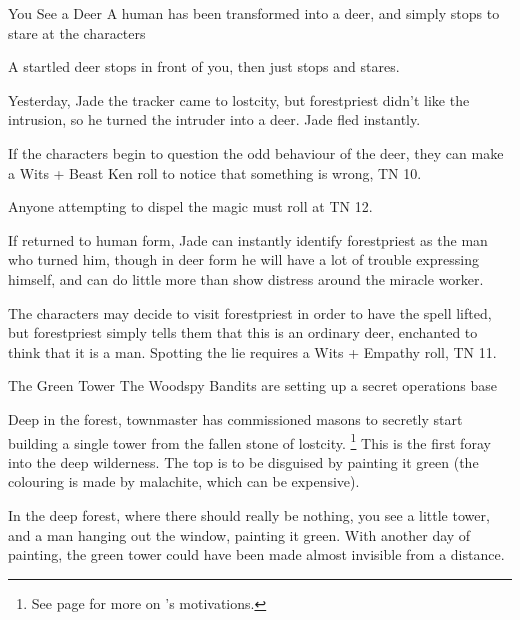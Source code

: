 \begin{multicols}{2}
\forestpriest

{You See a Deer}%
{A human has been transformed into a deer, and simply stops to stare at the characters}%

\begin{boxtext}

	A startled deer stops in front of you, then just stops and stares.

\end{boxtext}

Yesterday, Jade the tracker came to \gls{lostcity}, but \gls{forestpriest} didn't like the intrusion, so he turned the intruder into a deer.
Jade fled instantly.

If the characters begin to question the odd behaviour of the deer, they can make a Wits + Beast Ken roll to notice that something is wrong, TN 10.

Anyone attempting to dispel the magic must roll at TN 12.


If returned to human form, Jade can instantly identify \gls{forestpriest} as the man who turned him, though in deer form he will have a lot of trouble expressing himself, and can do little more than show distress around the miracle worker.

The characters may decide to visit \gls{forestpriest} in order to have the spell lifted, but \gls{forestpriest} simply tells them that this is an ordinary deer, enchanted to think that it is a man.
Spotting the lie requires a Wits + Empathy roll, TN 11.

{The Green Tower}%
{The Woodspy Bandits are setting up a secret operations base}%

Deep in the forest, \gls{townmaster} has commissioned masons to secretly start building a single tower from the fallen stone of \gls{lostcity}.
\footnote{See page \pageref{expanding_wilderness} for more on 's motivations.}
This is the first foray into the deep wilderness.
The top is to be disguised by painting it green (the colouring is made by malachite, which can be expensive).

\begin{boxtext}

	In the deep forest, where there should really be nothing, you see a little tower, and a man hanging out the window, painting it green.
	With another day of painting, the green tower could have been made almost invisible from a distance.


\end{boxtext}
\end{multicols}
